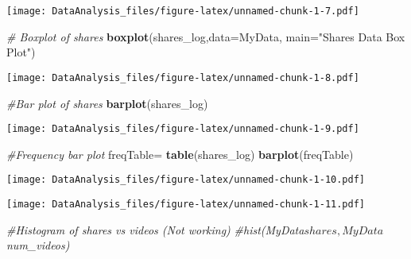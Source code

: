 \documentclass[]{article}
\newenvironment{Shaded}{\begin{snugshade}}{\end{snugshade}}
\newcommand{\KeywordTok}[1]{\textcolor[rgb]{0.13,0.29,0.53}{\textbf{#1}}}
\newcommand{\DataTypeTok}[1]{\textcolor[rgb]{0.13,0.29,0.53}{#1}}
\newcommand{\StringTok}[1]{\textcolor[rgb]{0.31,0.60,0.02}{#1}}
\newcommand{\CommentTok}[1]{\textcolor[rgb]{0.56,0.35,0.01}{\textit{#1}}}
\newcommand{\OperatorTok}[1]{\textcolor[rgb]{0.81,0.36,0.00}{\textbf{#1}}}
\newcommand{\NormalTok}[1]{#1}
\begin{document}
\texttt{[image: DataAnalysis\_files/figure-latex/unnamed-chunk-1-7.pdf]}

\begin{Shaded}
\begin{Highlighting}[]
\CommentTok{# Boxplot of shares}
\KeywordTok{boxplot}\NormalTok{(shares_log,}\DataTypeTok{data=}\NormalTok{MyData, }\DataTypeTok{main=}\StringTok{"Shares Data Box Plot"}\NormalTok{)}
\end{Highlighting}
\end{Shaded}

\texttt{[image: DataAnalysis\_files/figure-latex/unnamed-chunk-1-8.pdf]}

\begin{Shaded}
\begin{Highlighting}[]
\CommentTok{#Bar plot of shares}
\KeywordTok{barplot}\NormalTok{(shares_log)}
\end{Highlighting}
\end{Shaded}

\texttt{[image: DataAnalysis\_files/figure-latex/unnamed-chunk-1-9.pdf]}

\begin{Shaded}
\begin{Highlighting}[]
\CommentTok{#Frequency bar plot}
\NormalTok{freqTable=}\StringTok{ }\KeywordTok{table}\NormalTok{(shares_log)}
\KeywordTok{barplot}\NormalTok{(freqTable)}
\end{Highlighting}
\end{Shaded}

\texttt{[image: DataAnalysis\_files/figure-latex/unnamed-chunk-1-10.pdf]}

\begin{Shaded}
\end{Shaded}

\texttt{[image: DataAnalysis\_files/figure-latex/unnamed-chunk-1-11.pdf]}

\begin{Shaded}
\begin{Highlighting}[]
\CommentTok{#Histogram of shares vs videos (Not working)}
\CommentTok{#hist(MyData$shares,MyData$num_videos)}
\end{Highlighting}
\end{Shaded}
\end{document}
